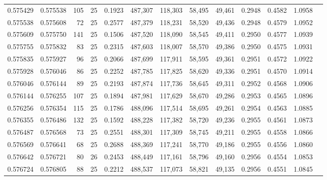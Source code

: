 \begin{tabular}{rrrrrrrrrrrrr}
0.575429 & 0.575538 &   105 &  25 &                                     0.1923 & 487,307 & 118,303 &  58,495 &  49,461 & 0.2948 & 0.4582 & 1.0958 \\
0.575538 & 0.575608 &    72 &  25 &                                     0.2577 & 487,379 & 118,231 &  58,520 &  49,436 & 0.2948 & 0.4579 & 1.0952 \\
0.575609 & 0.575750 &   141 &  25 &                                     0.1506 & 487,520 & 118,090 &  58,545 &  49,411 & 0.2950 & 0.4577 & 1.0939 \\
0.575755 & 0.575832 &    83 &  25 &                                     0.2315 & 487,603 & 118,007 &  58,570 &  49,386 & 0.2950 & 0.4575 & 1.0931 \\
0.575835 & 0.575927 &    96 &  25 &                                     0.2066 & 487,699 & 117,911 &  58,595 &  49,361 & 0.2951 & 0.4572 & 1.0922 \\
0.575928 & 0.576046 &    86 &  25 &                                     0.2252 & 487,785 & 117,825 &  58,620 &  49,336 & 0.2951 & 0.4570 & 1.0914 \\
0.576046 & 0.576144 &    89 &  25 &                                     0.2193 & 487,874 & 117,736 &  58,645 &  49,311 & 0.2952 & 0.4568 & 1.0906 \\
0.576144 & 0.576255 &   107 &  25 &                                     0.1894 & 487,981 & 117,629 &  58,670 &  49,286 & 0.2953 & 0.4565 & 1.0896 \\
0.576256 & 0.576354 &   115 &  25 &                                     0.1786 & 488,096 & 117,514 &  58,695 &  49,261 & 0.2954 & 0.4563 & 1.0885 \\
0.576355 & 0.576486 &   132 &  25 &                                     0.1592 & 488,228 & 117,382 &  58,720 &  49,236 & 0.2955 & 0.4561 & 1.0873 \\
0.576487 & 0.576568 &    73 &  25 &                                     0.2551 & 488,301 & 117,309 &  58,745 &  49,211 & 0.2955 & 0.4558 & 1.0866 \\
0.576569 & 0.576641 &    68 &  25 &                                     0.2688 & 488,369 & 117,241 &  58,770 &  49,186 & 0.2955 & 0.4556 & 1.0860 \\
0.576642 & 0.576721 &    80 &  26 &                                     0.2453 & 488,449 & 117,161 &  58,796 &  49,160 & 0.2956 & 0.4554 & 1.0853 \\
0.576724 & 0.576805 &    88 &  25 &                                     0.2212 & 488,537 & 117,073 &  58,821 &  49,135 & 0.2956 & 0.4551 & 1.0845 \\

\end{tabular}
